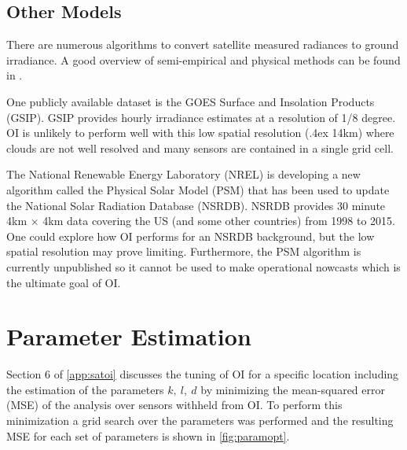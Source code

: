 \subsection{Other Models}
There are numerous algorithms to convert satellite measured radiances
to ground irradiance.
A good overview of semi-empirical and physical methods can be found in
\cite{Perez2013a,Miller2013}.

One publicly available dataset is the GOES Surface and Insolation
Products (GSIP).
GSIP provides hourly irradiance estimates at a resolution of 1/8
degree.
OI is unlikely to perform well with this low spatial resolution
({\raise.4ex \hbox{\texttildelow}}14km) where clouds are not well
resolved and many sensors are contained in a single grid cell.

The National Renewable Energy Laboratory (NREL) is developing a new
algorithm called the Physical Solar Model (PSM) that has been used to update
the National Solar Radiation Database (NSRDB).
NSRDB provides 30 minute 4km $\times$ 4km data covering the US (and
some other countries) from 1998 to 2015.
One could explore how OI performs for an NSRDB background, but the low
spatial resolution may prove limiting.
Furthermore, the PSM algorithm is currently unpublished so it cannot
be used to make operational nowcasts which is the ultimate goal of OI.


\section{Parameter Estimation}
\label{sec:paramopt}

Section 6 of \cref{app:satoi} discusses the tuning of OI for a
specific location including the estimation of the parameters $k,\:
l,\: d$ by minimizing the mean-squared error (MSE) of the analysis
over sensors withheld from OI.
To perform this minimization a grid search over the parameters was
performed and the resulting MSE for each set of parameters is shown in
\cref{fig:paramopt}.

